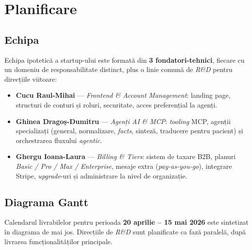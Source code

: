 \section{Planificare}

\subsection{Echipa}

Echipa ipotetică a startup-ului este formată din \textbf{3 fondatori-tehnici}, fiecare cu un domeniu de responsabilitate distinct, plus o linie comună de \textit{R\&D} pentru direcțiile viitoare:

\begin{itemize}
    \item \textbf{Cucu Raul-Mihai} --- \textit{Frontend \& Account Management}: landing page, structuri de conturi și roluri, securitate, acces preferențial la agenți.
    \item \textbf{Ghinea Dragoș-Dumitru} --- \textit{Agenți AI \& MCP}: \textit{tooling} MCP, agenții specializați (general, normalizare, \textit{facts}, sinteză, traducere pentru pacient) și orchestrarea fluxului \textit{agentic}.
    \item \textbf{Ghergu Ioana-Laura} --- \textit{Billing \& Tiers}: sistem de taxare B2B, planuri \textit{Basic / Pro / Max / Enterprise}, mesaje extra (\textit{pay-as-you-go}), integrare Stripe, \textit{upgrade}-uri și administrare la nivel de organizație.
\end{itemize}

\subsection{Diagrama Gantt}

Calendarul livrabilelor pentru perioada \textbf{20 aprilie -- 15 mai 2026} este sintetizat în diagrama de mai jos. Direcțiile de \textit{R\&D} sunt planificate ca fază paralelă, după livrarea funcționalităților principale.

